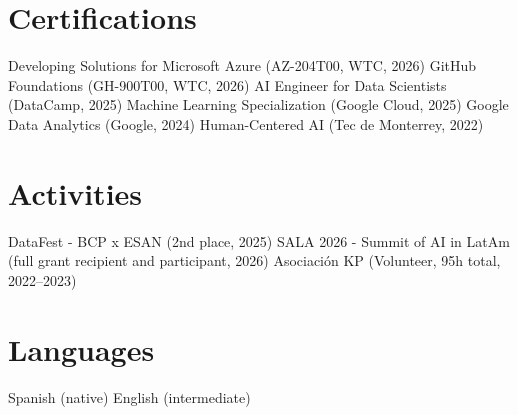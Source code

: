 \documentclass[a4paper,10pt]{article}
\begin{document}
\vspace{4pt}

\section*{Certifications}

Developing Solutions for Microsoft Azure (AZ-204T00, WTC, 2026) \textperiodcentered{}
GitHub Foundations (GH-900T00, WTC, 2026) \textperiodcentered{}
AI Engineer for Data Scientists (DataCamp, 2025) \textperiodcentered{}
Machine Learning Specialization (Google Cloud, 2025) \textperiodcentered{}
Google Data Analytics (Google, 2024) \textperiodcentered{}
Human-Centered AI (Tec de Monterrey, 2022)

\vspace{2pt}

\section*{Activities}

DataFest - BCP x ESAN (2nd place, 2025) \textperiodcentered{}
SALA 2026 - Summit of AI in LatAm (full grant recipient and participant, 2026) \textperiodcentered{}
Asociaci\'{o}n KP (Volunteer, 95h total, 2022--2023)

\vspace{2pt}

\section*{Languages}

Spanish (native) \textperiodcentered{} English (intermediate)
\end{document}

